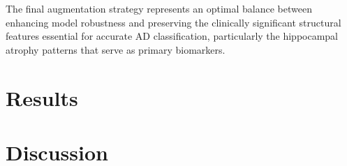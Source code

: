 \documentclass[12pt, a4paper]{article}
\begin{document}
The final augmentation strategy represents an optimal balance between enhancing model robustness and preserving the clinically significant structural features essential for accurate AD classification, particularly the hippocampal atrophy patterns that serve as primary biomarkers.


\section{Results}















\section{Discussion}
\end{document}
